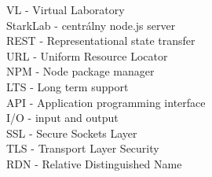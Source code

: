 VL - Virtual Laboratory \\
StarkLab - centrálny node.js server\\
REST - Representational state transfer\\
URL - Uniform Resource Locator\\
NPM - Node package manager\\
LTS - Long term support\\
API - Application programming interface\\
I/O - input and output\\
SSL - Secure Sockets Layer\\
TLS - Transport Layer Security\\
RDN - Relative Distinguished Name


